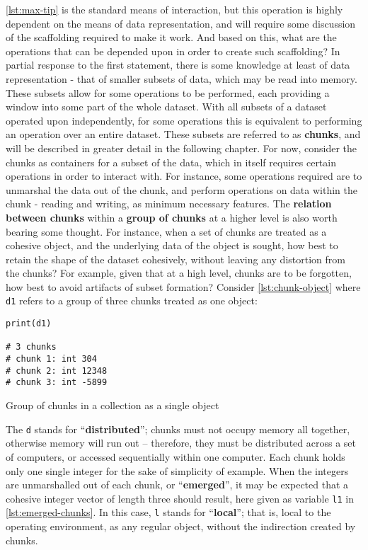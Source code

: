 \cref{lst:max-tip} is the standard means of interaction, but this operation is highly
dependent on the means of data representation, and will require some
discussion of the scaffolding required to make it work. And based on
this, what are the operations that can be depended upon in order to
create such scaffolding? In partial response to the first statement,
there is some knowledge at least of data representation - that of
smaller subsets of data, which may be read into memory. These subsets
allow for some operations to be performed, each providing a window into
some part of the whole dataset. With all subsets of a dataset operated
upon independently, for some operations this is equivalent to performing
an operation over an entire dataset. These subsets are referred to as
\textbf{chunks}, and will be described in greater detail in the
following chapter. For now, consider the chunks as containers for a
subset of the data, which in itself requires certain operations in order
to interact with. For instance, some operations required are to
unmarshal the data out of the chunk, and perform operations on data
within the chunk - reading and writing, as minimum necessary features.
The \textbf{relation between chunks} within a \textbf{group of chunks}
at a higher level is also worth bearing some thought. For instance, when
a set of chunks are treated as a cohesive object, and the underlying
data of the object is sought, how best to retain the shape of the
dataset cohesively, without leaving any distortion from the chunks? For
example, given that at a high level, chunks are to be forgotten, how
best to avoid artifacts of subset formation? Consider \cref{lst:chunk-object}
where \texttt{d1} refers to a group of three chunks treated as one
object:

\begin{listing}
    \begin{verbatim}
print(d1)

# 3 chunks
# chunk 1: int 304
# chunk 2: int 12348
# chunk 3: int -5899
\end{verbatim}
    \caption{Group of chunks in a collection as a single object}
    \label{lst:chunk-object}
\end{listing}

The \texttt{d} stands for ``\textbf{distributed}''; chunks must not
occupy memory all together, otherwise memory will run out -- therefore,
they must be distributed across a set of computers, or accessed
sequentially within one computer. Each chunk holds only one single
integer for the sake of simplicity of example. When the integers are
unmarshalled out of each chunk, or ``\textbf{emerged}'', it may be
expected that a cohesive integer vector of length three should result,
here given as variable \texttt{l1} in \cref{lst:emerged-chunks}. In this case, \texttt{l} stands for
``\textbf{local}''; that is, local to the operating environment, as any
regular object, without the indirection created by chunks.

